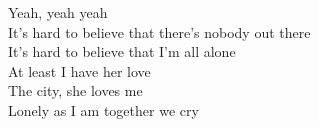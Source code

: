 Yeah, yeah yeah \\

It's hard to believe that there's nobody out there \\
It's hard to believe that I'm all alone \\
At least I have her love \\
The city, she loves me \\
Lonely as I am together we cry \\
